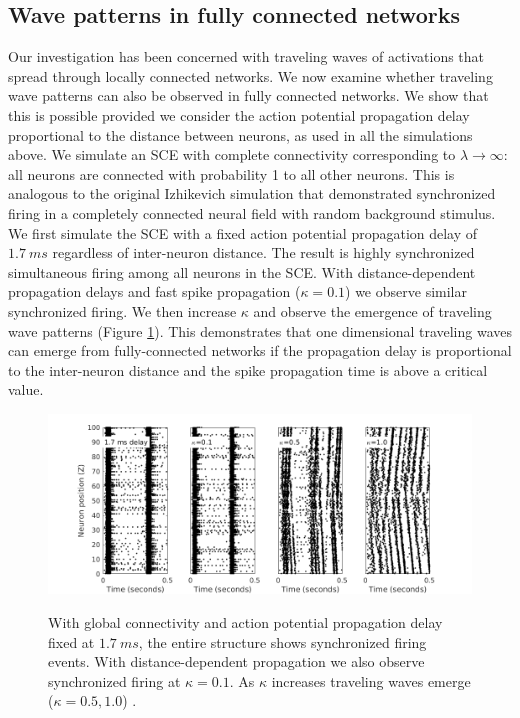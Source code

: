 \documentclass[12pt]{article}
\begin{document}
\FloatBarrier

\subsection{Wave patterns in fully connected networks} \label{sub:delay}
Our investigation has been concerned with traveling waves of activations that spread through locally connected networks.
We now examine whether traveling wave patterns can also be observed in fully connected networks.
We show that this is possible provided we consider the action potential propagation delay proportional to the distance between neurons, as used in all the simulations above.
We simulate an SCE with complete connectivity corresponding to $\lambda \rightarrow \infty$: all neurons are connected with probability 1 to all other neurons.
This is analogous to the original Izhikevich simulation that demonstrated synchronized firing in a completely connected neural field with random background stimulus.
We first simulate the SCE with a fixed action potential propagation delay of \color{red}$1.7~ms$ \parencite{Markram1997} \color{black} regardless of inter-neuron distance.
The result is highly synchronized simultaneous firing among all neurons in the SCE.
\color{red} 
With distance-dependent propagation delays and fast spike propagation ($\kappa=0.1$) we observe similar synchronized firing.
We then increase $\kappa$ and observe the emergence of traveling wave patterns (Figure \ref{fig:delay_waves}). \color{black}
This demonstrates that one dimensional traveling waves can emerge from fully-connected networks if the propagation delay is proportional to the inter-neuron distance \color{red}and the spike propagation time is above a critical value\color{black}.
\begin{figure}[!htb]
 \caption{With global connectivity and action potential propagation delay \color{red}fixed at $1.7~ms$\color{black}, the entire structure shows synchronized firing events.
          \color{red}
          With distance-dependent propagation we also observe synchronized firing at $\kappa=0.1$.
          As $\kappa$ increases traveling waves emerge ($\kappa=0.5, 1.0$) \color{black}.}
 \centering
   \includegraphics[width=\textwidth]{fig/DelayWaves}  
 \label{fig:delay_waves}
\end{figure}
\end{document}
